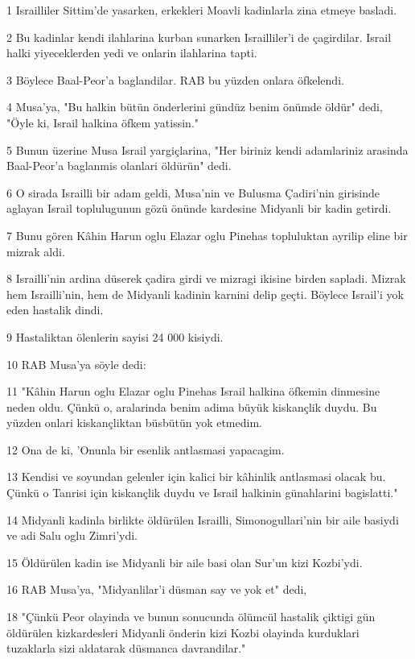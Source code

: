\par 1 Israilliler Sittim'de yasarken, erkekleri Moavli kadinlarla zina etmeye basladi.
\par 2 Bu kadinlar kendi ilahlarina kurban sunarken Israilliler'i de çagirdilar. Israil halki yiyeceklerden yedi ve onlarin ilahlarina tapti.
\par 3 Böylece Baal-Peor'a baglandilar. RAB bu yüzden onlara öfkelendi.
\par 4 Musa'ya, "Bu halkin bütün önderlerini gündüz benim önümde öldür" dedi, "Öyle ki, Israil halkina öfkem yatissin."
\par 5 Bunun üzerine Musa Israil yargiçlarina, "Her biriniz kendi adamlariniz arasinda Baal-Peor'a baglanmis olanlari öldürün" dedi.
\par 6 O sirada Israilli bir adam geldi, Musa'nin ve Bulusma Çadiri'nin girisinde aglayan Israil toplulugunun gözü önünde kardesine Midyanli bir kadin getirdi.
\par 7 Bunu gören Kâhin Harun oglu Elazar oglu Pinehas topluluktan ayrilip eline bir mizrak aldi.
\par 8 Israilli'nin ardina düserek çadira girdi ve mizragi ikisine birden sapladi. Mizrak hem Israilli'nin, hem de Midyanli kadinin karnini delip geçti. Böylece Israil'i yok eden hastalik dindi.
\par 9 Hastaliktan ölenlerin sayisi 24 000 kisiydi.
\par 10 RAB Musa'ya söyle dedi:
\par 11 "Kâhin Harun oglu Elazar oglu Pinehas Israil halkina öfkemin dinmesine neden oldu. Çünkü o, aralarinda benim adima büyük kiskançlik duydu. Bu yüzden onlari kiskançliktan büsbütün yok etmedim.
\par 12 Ona de ki, 'Onunla bir esenlik antlasmasi yapacagim.
\par 13 Kendisi ve soyundan gelenler için kalici bir kâhinlik antlasmasi olacak bu. Çünkü o Tanrisi için kiskançlik duydu ve Israil halkinin günahlarini bagislatti."
\par 14 Midyanli kadinla birlikte öldürülen Israilli, Simonogullari'nin bir aile basiydi ve adi Salu oglu Zimri'ydi.
\par 15 Öldürülen kadin ise Midyanli bir aile basi olan Sur'un kizi Kozbi'ydi.
\par 16 RAB Musa'ya, "Midyanlilar'i düsman say ve yok et" dedi,
\par 18 "Çünkü Peor olayinda ve bunun sonucunda ölümcül hastalik çiktigi gün öldürülen kizkardesleri Midyanli önderin kizi Kozbi olayinda kurduklari tuzaklarla sizi aldatarak düsmanca davrandilar."

